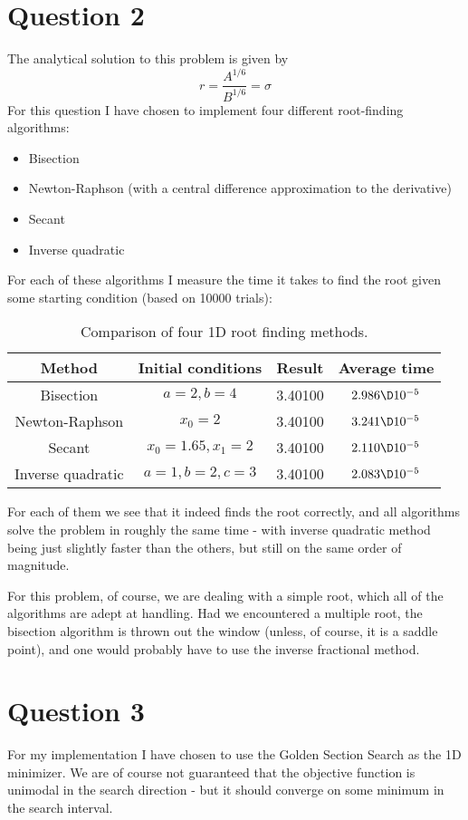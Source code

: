 \documentclass[a4paper,10pt]{article}
\begin{document}
	\section*{Question 2}
	The analytical solution to this problem is given by
	\begin{equation}\label{key}
		r = \frac{A^{1/6}}{B^{1/6}} = \sigma
	\end{equation}
	For this question I have chosen to implement four different root-finding algorithms:
	\begin{itemize}
		\item Bisection
		\item Newton-Raphson (with a central difference approximation to the derivative)
		\item Secant
		\item Inverse quadratic
	\end{itemize}
	For each of these algorithms I measure the time it takes to find the root given some starting condition (based on 10000 trials):
	\begin{table}[H]
		\centering
		\begin{tabular}{c|c|c|c}
			Method & Initial conditions & Result & Average time \\
			\hline
			Bisection & $ a=2, b=4 $ & 3.40100 & $ 2.986\D10^{-5} $ \\
			Newton-Raphson & $ x_0 = 2 $ & 3.40100 & $ 3.241\D10^{-5} $ \\
			Secant & $ x_0 = 1.65, x_1 = 2 $ & 3.40100 & $ 2.110\D10^{-5} $ \\
			Inverse quadratic & $ a=1, b=2, c=3 $ & 3.40100 & $ 2.083\D10^{-5} $
		\end{tabular}
		\caption{Comparison of four 1D root finding methods.}
		\label{tab:roots}
	\end{table}
	For each of them we see that it indeed finds the root correctly, and all algorithms solve the problem in roughly the same time - with inverse quadratic method being just slightly faster than the others, but still on the same order of magnitude. 
	
	For this problem, of course, we are dealing with a simple root, which all of the algorithms are adept at handling. Had we encountered a multiple root, the bisection algorithm is thrown out the window (unless, of course, it is a saddle point), and one would probably have to use the inverse fractional method.
	
	\section*{Question 3}
	For my implementation I have chosen to use the Golden Section Search as the 1D minimizer. We are of course not guaranteed that the objective function is unimodal in the search direction - but it should converge on some minimum in the search interval.
	
\end{document}
